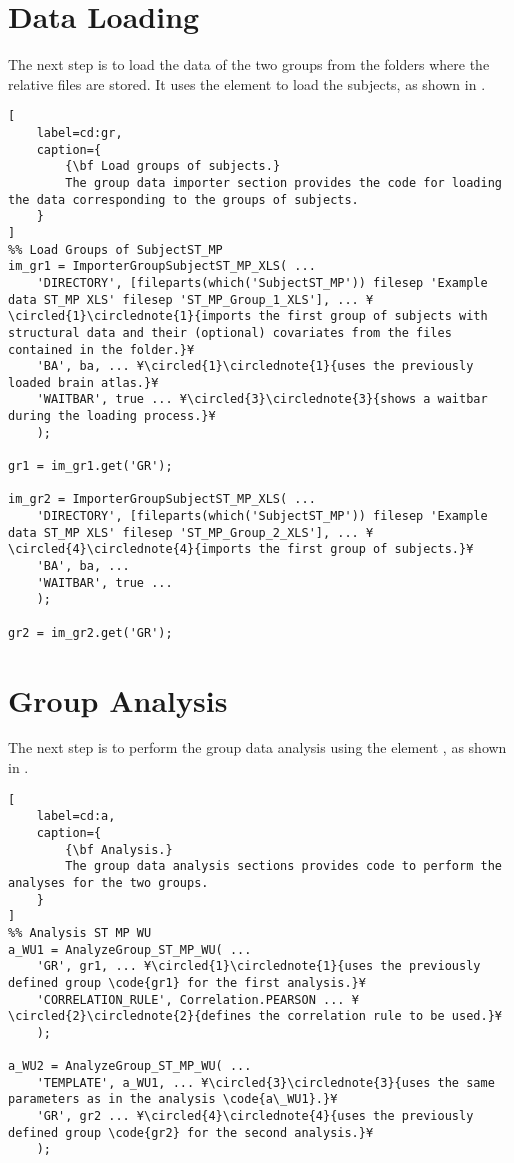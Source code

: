 \documentclass{tufte-handout}
\begin{document}
\section{Data Loading}

The next step is to load the data of the two groups from the folders where the relative  files are stored. It uses the element  to load the  subjects, as shown in .

\begin{lstlisting}[
	label=cd:gr,
	caption={
		{\bf Load groups of subjects.}
		The group data importer section provides the code for loading the data corresponding to the groups of subjects.
	}
]
%% Load Groups of SubjectST_MP
im_gr1 = ImporterGroupSubjectST_MP_XLS( ...
    'DIRECTORY', [fileparts(which('SubjectST_MP')) filesep 'Example data ST_MP XLS' filesep 'ST_MP_Group_1_XLS'], ... ¥\circled{1}\circlednote{1}{imports the first group of subjects with structural data and their (optional) covariates from the files contained in the folder.}¥
    'BA', ba, ... ¥\circled{1}\circlednote{1}{uses the previously loaded brain atlas.}¥
    'WAITBAR', true ... ¥\circled{3}\circlednote{3}{shows a waitbar during the loading process.}¥
    );

gr1 = im_gr1.get('GR');

im_gr2 = ImporterGroupSubjectST_MP_XLS( ...
    'DIRECTORY', [fileparts(which('SubjectST_MP')) filesep 'Example data ST_MP XLS' filesep 'ST_MP_Group_2_XLS'], ... ¥\circled{4}\circlednote{4}{imports the first group of subjects.}¥
    'BA', ba, ...
    'WAITBAR', true ...
    );

gr2 = im_gr2.get('GR');

\end{lstlisting}

\section{Group Analysis}

The next step is to perform the group data analysis using the element \code{}, as shown in .

\begin{lstlisting}[
	label=cd:a,
	caption={
		{\bf Analysis.}
		The group data analysis sections provides code to perform the analyses for the two groups.
	}
]
%% Analysis ST MP WU
a_WU1 = AnalyzeGroup_ST_MP_WU( ...
    'GR', gr1, ... ¥\circled{1}\circlednote{1}{uses the previously defined group \code{gr1} for the first analysis.}¥
    'CORRELATION_RULE', Correlation.PEARSON ... ¥\circled{2}\circlednote{2}{defines the correlation rule to be used.}¥
    );

a_WU2 = AnalyzeGroup_ST_MP_WU( ...
    'TEMPLATE', a_WU1, ... ¥\circled{3}\circlednote{3}{uses the same parameters as in the analysis \code{a\_WU1}.}¥
    'GR', gr2 ... ¥\circled{4}\circlednote{4}{uses the previously defined group \code{gr2} for the second analysis.}¥
    );

\end{lstlisting}
\end{document}
